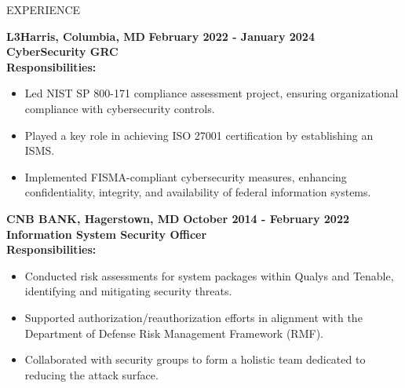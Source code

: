 \documentclass{resume} %
\begin{document}
\begin{rSection}{EXPERIENCE}
\begin{flushleft}
\begin{itemize}
                            \end{itemize}
            \vspace{0.5em}
            \textbf{L3Harris, Columbia, MD} \hfill \textbf{February 2022 {-} January 2024} \\
            \textbf{CyberSecurity GRC} \\
            \vspace{1em}
            \textbf{Responsibilities:} \\
            \begin{itemize}
                                    \item Led NIST SP 800{-}171 compliance assessment project, ensuring organizational compliance with cybersecurity controls.
                                    \item Played a key role in achieving ISO 27001 certification by establishing an ISMS.
                                    \item Implemented FISMA{-}compliant cybersecurity measures, enhancing confidentiality, integrity, and availability of federal information systems.
                            \end{itemize}
            \vspace{0.5em}
            \textbf{CNB BANK, Hagerstown, MD} \hfill \textbf{October 2014 {-} February 2022} \\
            \textbf{Information System Security Officer} \\
            \vspace{1em}
            \textbf{Responsibilities:} \\
            \begin{itemize}
                                    \item Conducted risk assessments for system packages within Qualys and Tenable, identifying and mitigating security threats.
                                    \item Supported authorization/reauthorization efforts in alignment with the Department of Defense Risk Management Framework (RMF).
                                    \item Collaborated with security groups to form a holistic team dedicated to reducing the attack surface.
                            \end{itemize}
            \vspace{0.5em}
            \end{flushleft} 
\end{rSection}
\end{document}
